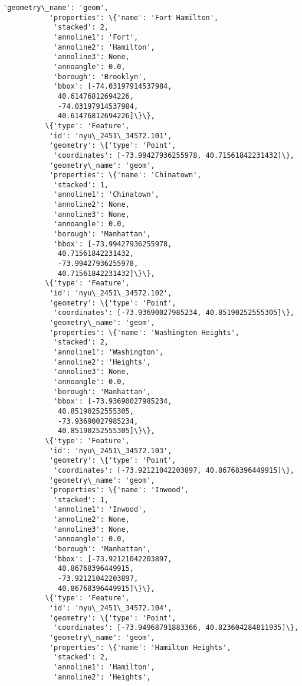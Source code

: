 \documentclass[11pt]{article}
\begin{document}
\begin{Verbatim}[commandchars=\\\{\}]
           'geometry\_name': 'geom',
           'properties': \{'name': 'Fort Hamilton',
            'stacked': 2,
            'annoline1': 'Fort',
            'annoline2': 'Hamilton',
            'annoline3': None,
            'annoangle': 0.0,
            'borough': 'Brooklyn',
            'bbox': [-74.03197914537984,
             40.61476812694226,
             -74.03197914537984,
             40.61476812694226]\}\},
          \{'type': 'Feature',
           'id': 'nyu\_2451\_34572.101',
           'geometry': \{'type': 'Point',
            'coordinates': [-73.99427936255978, 40.71561842231432]\},
           'geometry\_name': 'geom',
           'properties': \{'name': 'Chinatown',
            'stacked': 1,
            'annoline1': 'Chinatown',
            'annoline2': None,
            'annoline3': None,
            'annoangle': 0.0,
            'borough': 'Manhattan',
            'bbox': [-73.99427936255978,
             40.71561842231432,
             -73.99427936255978,
             40.71561842231432]\}\},
          \{'type': 'Feature',
           'id': 'nyu\_2451\_34572.102',
           'geometry': \{'type': 'Point',
            'coordinates': [-73.93690027985234, 40.85190252555305]\},
           'geometry\_name': 'geom',
           'properties': \{'name': 'Washington Heights',
            'stacked': 2,
            'annoline1': 'Washington',
            'annoline2': 'Heights',
            'annoline3': None,
            'annoangle': 0.0,
            'borough': 'Manhattan',
            'bbox': [-73.93690027985234,
             40.85190252555305,
             -73.93690027985234,
             40.85190252555305]\}\},
          \{'type': 'Feature',
           'id': 'nyu\_2451\_34572.103',
           'geometry': \{'type': 'Point',
            'coordinates': [-73.92121042203897, 40.86768396449915]\},
           'geometry\_name': 'geom',
           'properties': \{'name': 'Inwood',
            'stacked': 1,
            'annoline1': 'Inwood',
            'annoline2': None,
            'annoline3': None,
            'annoangle': 0.0,
            'borough': 'Manhattan',
            'bbox': [-73.92121042203897,
             40.86768396449915,
             -73.92121042203897,
             40.86768396449915]\}\},
          \{'type': 'Feature',
           'id': 'nyu\_2451\_34572.104',
           'geometry': \{'type': 'Point',
            'coordinates': [-73.94968791883366, 40.823604284811935]\},
           'geometry\_name': 'geom',
           'properties': \{'name': 'Hamilton Heights',
            'stacked': 2,
            'annoline1': 'Hamilton',
            'annoline2': 'Heights',

\end{Verbatim}
\end{document}
